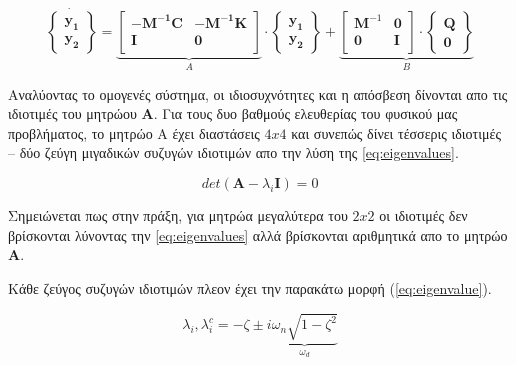 \begin{equation}
\dot{
    \begin{Bmatrix}
    \mathbf{y_1}\\
    \mathbf{y_2}
    \end{Bmatrix}
    } = 
    \underbrace{
    \begin{bmatrix}
        -\mathbf{M^{-1} C} & -\mathbf{M^{-1} K}\\
        \mathbf{I} & \mathbf{0}\\
    \end{bmatrix}
    }_{A}
    \cdot
    \begin{Bmatrix}
    \mathbf{y_1}\\
    \mathbf{y_2}
    \end{Bmatrix}
    +
    \underbrace{
    \begin{bmatrix}
        \mathbf{M}^{-1} & \mathbf{0}\\
        \mathbf{0} & \mathbf{I}\\
    \end{bmatrix}\cdot
    \begin{Bmatrix}
    \mathbf{Q}\\
    \mathbf{0}
    \end{Bmatrix}
    }_{B}
    \label{eq:finstatespace}
\end{equation}

Αναλύοντας το ομογενές σύστημα, οι ιδιοσυχνότητες και η απόσβεση δίνονται απο τις ιδιοτιμές του μητρώου \textbf{A}. Για τους δυο βαθμούς ελευθερίας του φυσικού μας προβλήματος, το μητρώο Α έχει διαστάσεις $4x4$ και συνεπώς δίνει τέσσερις ιδιοτιμές -- δύο ζεύγη μιγαδικών συζυγών ιδιοτιμών απο την λύση της \cref{eq:eigenvalues}. 

\begin{equation}
    det(\mathbf{A}-\lambda_i\mathbf{I})=0
\label{eq:eigenvalues}
\end{equation}

Σημειώνεται πως στην πράξη, για μητρώα μεγαλύτερα του $2x2$ οι ιδιοτιμές δεν βρίσκονται λύνοντας την \cref{eq:eigenvalues} αλλά βρίσκονται αριθμητικά απο το μητρώο \textbf{A}.

Κάθε ζεύγος συζυγών ιδιοτιμών πλεον έχει την παρακάτω μορφή (\cref{eq:eigenvalue}).

\begin{equation}
    \lambda_i, \lambda_i^c = -\zeta \pm i\underbrace{\omega_n\sqrt{1-\zeta^2}}_{\omega_d}
    \label{eq:eigenvalue}
\end{equation}

